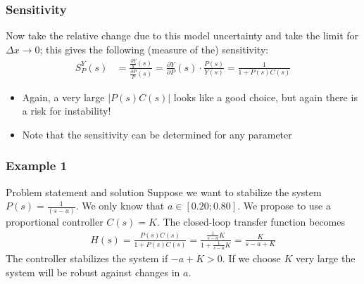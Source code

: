 \begin{frame}
	\frametitle{Sensitivity}
	\begin{alertblock}{}
		Now take the relative change due to this model uncertainty and take the limit for $\Delta x \rightarrow 0$; this gives the following (measure of the) sensitivity:
		\begin{align*}
			S_P^Y(s) &= \frac{\frac{\partial Y}{Y}(s)}{\frac{\partial P}{P}(s)} = \frac{\partial Y}{\partial P}\left(s\right) \cdot \frac{P(s)}{Y(s)} = \frac{1}{1 + P(s)C(s)}
		\end{align*}
	\end{alertblock}
	\begin{block}{}
		\begin{itemize}
			\item Again, a very large $\left|P(s)C(s)\right|$ looks like a good choice, but again there is a risk for instability!
			\item Note that the sensitivity can be determined for any parameter	
		\end{itemize}
	\end{block}
\end{frame}

\begin{frame}
	\frametitle{Example 1}
	\begin{exampleblock}{Problem statement and solution}
		Suppose we want to stabilize the system $P(s)=\frac{1}{(s - a)}$.  We only know that $a \in [0.20;0.80]$. We propose to use a proportional controller $C(s)=K$.
		The closed-loop transfer function becomes
		\begin{align*}
			H(s) = \frac{P(s)C(s)}{1+P(s)C(s)} = \frac{\frac{1}{s-a}K}{1+\frac{1}{s-a}K} = \frac{K}{s-a+K}
		\end{align*}
		The controller stabilizes the system if $ - a+K>0$. If we choose $K$ very large the system will be robust against changes in $a$.
		
	\end{exampleblock}
\end{frame}


